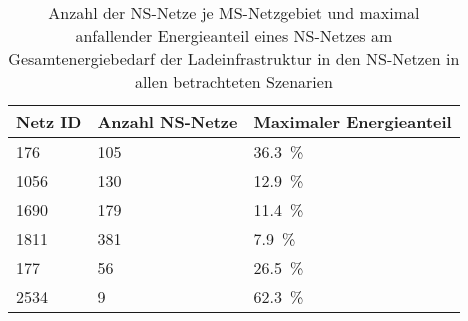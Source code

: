 {
\renewcommand{\arraystretch}{1.2}%
\begin{table}[H]
	\begin{center}
		\caption{Anzahl der NS-Netze je MS-Netzgebiet und maximal anfallender Energieanteil eines NS-Netzes am Gesamtenergiebedarf der Ladeinfrastruktur in den NS-Netzen in allen betrachteten Szenarien}
		\begin{tabu} to 0.7\textwidth {X[0.75] X[1, r] X[1.5, r]}
			\hline
			Netz ID    & Anzahl NS-Netze & Maximaler Energieanteil 			\\ \hline
			\num{176}  & \num{105}       & \SI{36.3}{\percent}              \\
			\num{1056} & \num{130}       & \SI{12.9}{\percent}              \\
			\num{1690} & \num{179}       & \SI{11.4}{\percent}              \\
			\num{1811} & \num{381}       & \SI{7.9}{\percent}               \\
			\num{177}  & \num{56}        & \SI{26.5}{\percent}              \\
			\num{2534} & \num{9}         & \SI{62.3}{\percent}              \\ \hline
		\end{tabu}
		\label{tab:largestLVGridShare}
	\end{center}
	\vspace{-3mm}%
\end{table}
}